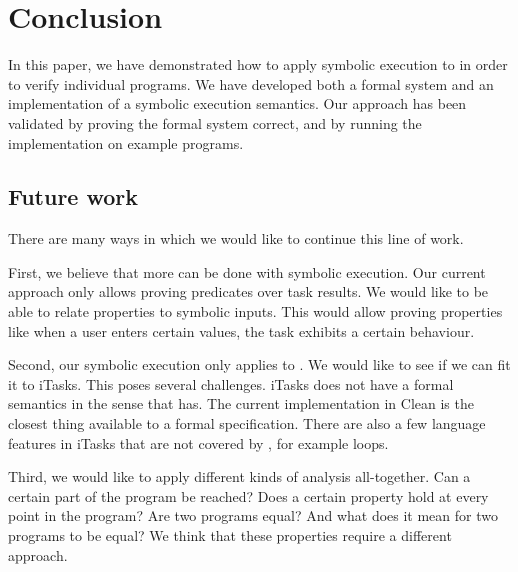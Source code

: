 
\section{Conclusion}

\label{sec:conclusion}

In this paper, we have demonstrated how to apply symbolic execution to \TOPHAT in order to verify individual programs.
We have developed both a formal system and an implementation of a symbolic execution semantics.
Our approach has been validated by proving the formal system correct, and by running the implementation on example programs.

\subsection{Future work}

There are many ways in which we would like to continue this line of work.

First, we believe that more can be done with symbolic execution.
Our current approach only allows proving predicates over task results.
We would like to be able to relate properties to symbolic inputs.
This would allow proving properties like when a user enters certain values, the task exhibits a certain behaviour.

Second, our symbolic execution only applies to \TOPHAT.
We would like to see if we can fit it to iTasks.
This poses several challenges.
iTasks does not have a formal semantics in the sense that \TOPHAT has.
The current implementation in Clean is the closest thing available to a formal specification.
There are also a few language features in iTasks that are not covered by \TOPHAT, for example loops.

Third, we would like to apply different kinds of analysis all-together.
Can a certain part of the program be reached?
Does a certain property hold at every point in the program?
Are two programs equal? And what does it mean for two programs to be equal?
We think that these properties require a different approach.
